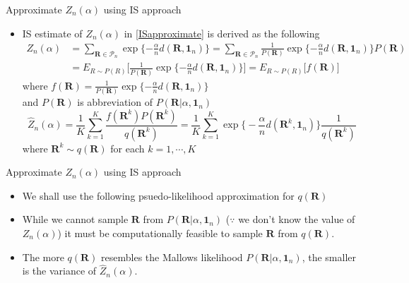 \documentclass[11pt]{beamer}
\begin{document}
\begin{frame}{Approximate $Z_n(\alpha)$ using IS approach}
\begin{itemize}
    \item IS estimate of $Z_n(\alpha)$ in \eqref{ISapproximate} is derived as the following
    \begin{align*}
        Z_n(\alpha)&=\sum_{\mathbf{R}\in \mathcal{P}_n}\exp\{-\frac{\alpha}{n}d(\mathbf{R},\mathbf{1}_n)\} =\sum_{\mathbf{R}\in \mathcal{P}_n}\frac{1}{P(\mathbf{R})}\exp\{-\frac{\alpha}{n}d(\mathbf{R},\mathbf{1}_n)\}P(\mathbf{R}) \\ &=E_{R\sim P(R)}\Big[ \frac{1}{P(\mathbf{R})}\exp\{-\frac{\alpha}{n}d(\mathbf{R},\mathbf{1}_n)\}\Big] = E_{R\sim P(R)}\big[f(\mathbf{R}) \big]
    \end{align*}
    where $f(\mathbf{R})=\frac{1}{P(\mathbf{R})}\exp\{-\frac{\alpha}{n}d(\mathbf{R},\mathbf{1}_n)\}$ \\and $P(\mathbf{R})$ is abbreviation of $P(\mathbf{R}|\alpha, \mathbf{1}_n)$
    \begin{equation*}
        \hat{Z}_n(\alpha)=\frac{1}{K}\sum_{k=1}^K \frac{f(\mathbf{R}^k)P(\mathbf{R}^k)}{q(\mathbf{R}^k)} =\frac{1}{K}\sum_{k=1}^K \exp\big\{-\frac{\alpha}{n}d(\mathbf{R}^k, \mathbf{1}_n) \big\}\frac{1}{q(\mathbf{R}^k)}
    \end{equation*}
    where $\mathbf{R}^k\sim q(\mathbf{R})$ for each $k=1, \cdots , K$
\end{itemize}
\end{frame}

\begin{frame}{Approximate $Z_n(\alpha)$ using IS approach}
\begin{itemize}
    \item We shall use the following psuedo-likelihood approximation for $q(\mathbf{R})$
    \item While we cannot sample $\mathbf{R}$ from $P(\mathbf{R}|\alpha, \mathbf{1}_n)$ ($\because$ we don't know the value of $Z_n(\alpha)$) it must be computationally feasible to sample $\mathbf{R}$ from $q(\mathbf{R})$.
    \item The more $q(\mathbf{R})$ resembles the Mallows likelihood $P(\mathbf{R}| \alpha, \mathbf{1}_n)$, the smaller is the variance of $\hat{Z}_n(\alpha)$. 
\end{itemize}
\end{frame}
\end{document}
